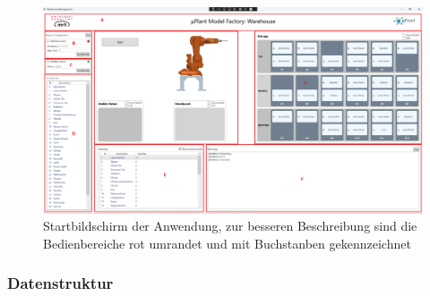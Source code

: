     \begin{figure}[h]
        \label{fig:figure}
        \includegraphics[width = \textwidth ]{Bilder/LV_Startbildschirm}

        \caption[Ansicht des Startbildschirms]
        {\small Startbildschirm der Anwendung, zur besseren Beschreibung sind die Bedienbereiche rot umrandet und mit
        Buchstanben gekennzeichnet}
        \centering
    \end{figure}

    \subsubsection{Datenstruktur}

